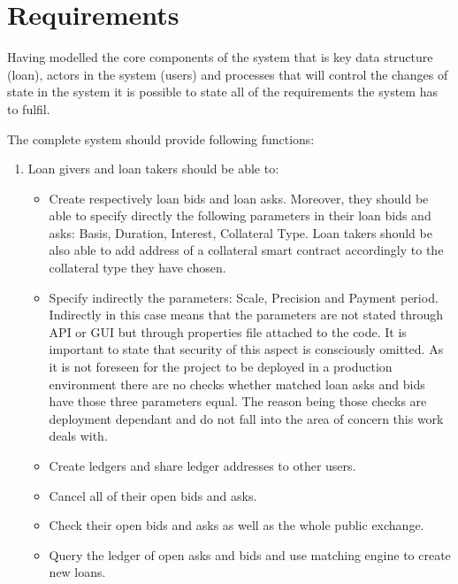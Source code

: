 \documentclass[a4paper,12pt,twoside,openany]{report}
\begin{document}
\section{Requirements}

Having modelled the core components of the system that is key data structure (loan), actors in the system (users) and processes that will control the changes of state in the system it is possible to state all of the requirements the system has to fulfil.

The complete system should provide following functions:
\begin{enumerate}

\item Loan givers and loan takers should be able to:
\begin{itemize}
\item Create respectively loan bids and loan asks. Moreover, they should be able to specify directly the following parameters in their loan bids and asks: Basis, Duration, Interest, Collateral Type. Loan takers should be also able to add address of a collateral smart contract accordingly to the collateral type they have chosen.
\item Specify indirectly the parameters: Scale, Precision and Payment period. Indirectly in this case means that the parameters are not stated through API or GUI but through properties file attached to the code. It is important to state that security of this aspect is consciously omitted. As it is not foreseen for the project to be deployed in a production environment there are no checks whether matched loan asks and bids have those three parameters equal. The reason being those checks are deployment dependant and do not fall into the area of concern this work deals with.
\item Create ledgers and share ledger addresses to other users.
\item Cancel all of their open bids and asks.
\item Check their open bids and asks as well as the whole public exchange.
\item Query the ledger of open asks and bids and use matching engine to create new loans.
\end{itemize}


\end{enumerate}
\end{document}
